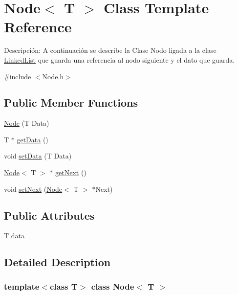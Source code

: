 \hypertarget{class_node}{}\section{Node$<$ T $>$ Class Template Reference}
\label{class_node}


Descripción\+: A continuación se describe la Clase Nodo ligada a la clase \hyperlink{class_linked_list}{Linked\+List} que guarda una referencia al nodo siguiente y el dato que guarda.  




{\ttfamily \#include $<$Node.\+h$>$}

\subsection*{Public Member Functions}
\begin{DoxyCompactItemize}
\item 
\hyperlink{class_node_a68c5bd839a73a772a935943075121c5c}{Node} (T Data)
\item 
T $\ast$ \hyperlink{class_node_a130e6bec4c78a3885b7da48e16ec2764}{get\+Data} ()
\item 
void \hyperlink{class_node_afd071a8970cc6eba929456fb1f625cba}{set\+Data} (T Data)
\item 
\hyperlink{class_node}{Node}$<$ T $>$ $\ast$ \hyperlink{class_node_a688501032615bbd05c9f42ef89d63db5}{get\+Next} ()
\item 
void \hyperlink{class_node_ab0624de0247235dfde00c057b838070e}{set\+Next} (\hyperlink{class_node}{Node}$<$ T $>$ $\ast$Next)
\end{DoxyCompactItemize}
\subsection*{Public Attributes}
\begin{DoxyCompactItemize}
\item 
T \hyperlink{class_node_ac450c71a8677a38d306361f9ced518d3}{data}
\end{DoxyCompactItemize}


\subsection{Detailed Description}
\subsubsection*{template$<$class T$>$\newline
class Node$<$ T $>$}

